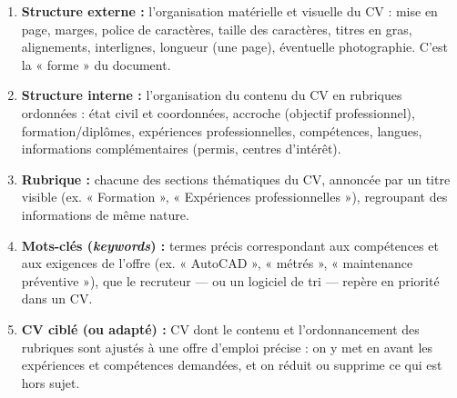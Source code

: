 \documentclass[11pt]{article}
\begin{document}
\begin{corrige}
\begin{enumerate}
\item \textbf{Structure externe :} l'organisation matérielle et visuelle du CV : mise en page, marges, police de caractères, taille des caractères, titres en gras, alignements, interlignes, longueur (une page), éventuelle photographie. C'est la « forme » du document.
\item \textbf{Structure interne :} l'organisation du contenu du CV en rubriques ordonnées : état civil et coordonnées, accroche (objectif professionnel), formation/diplômes, expériences professionnelles, compétences, langues, informations complémentaires (permis, centres d'intérêt).
\item \textbf{Rubrique :} chacune des sections thématiques du CV, annoncée par un titre visible (ex. « Formation », « Expériences professionnelles »), regroupant des informations de même nature.
\item \textbf{Mots-clés (\emph{keywords}) :} termes précis correspondant aux compétences et aux exigences de l'offre (ex. « AutoCAD », « métrés », « maintenance préventive »), que le recruteur — ou un logiciel de tri — repère en priorité dans un CV.
\item \textbf{CV ciblé (ou adapté) :} CV dont le contenu et l'ordonnancement des rubriques sont ajustés à une offre d'emploi précise : on y met en avant les expériences et compétences demandées, et on réduit ou supprime ce qui est hors sujet.
\end{enumerate}
\end{corrige}
\end{document}
